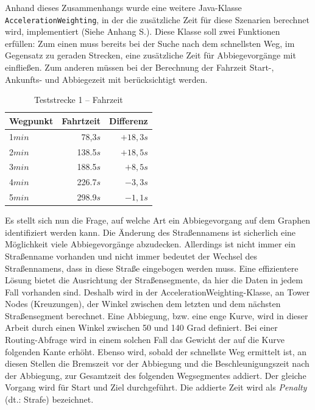 Anhand dieses Zusammenhangs wurde eine weitere Java-Klasse \texttt{AccelerationWeighting}, in der die zusätzliche Zeit für diese Szenarien berechnet wird, implementiert (Siehe Anhang S.\pageref{sec:source}).
Diese Klasse soll zwei Funktionen erfüllen:
Zum einen muss bereits bei der Suche nach dem schnellsten Weg, im Gegensatz zu geraden Strecken, eine zusätzliche Zeit für Abbiegevorgänge mit einfließen.
Zum anderen müssen bei der Berechnung der Fahrzeit Start-, Ankunfts- und Abbiegezeit mit berücksichtigt werden.

\begin{table}[htb]
\centering
\caption{Teststrecke 1 -- Fahrzeit}
\label{tab:drive11}
\begin{tabular}{|l|r|r|}
\hline
Wegpunkt & Fahrtzeit & Differenz \\ \hline 
1$min$ & 78,3$s$ & $+18,3s$ \\
2$min$ & 138.5$s$ & $+18,5s$ \\
3$min$ & 188.5$s$ & $+8,5s$ \\
4$min$ & 226.7$s$ & $-3,3s$ \\
5$min$ & 298.9$s$ & $-1,1s$ \\
\hline
\end{tabular}
\end{table}

Es stellt sich nun die Frage, auf welche Art ein Abbiegevorgang auf dem Graphen identifiziert werden kann.
Die Änderung des Straßennamens ist sicherlich eine Möglichkeit viele Abbiegevorgänge abzudecken.
Allerdings ist nicht immer ein Straßenname vorhanden und nicht immer bedeutet der Wechsel des Straßennamens, dass in diese Straße eingebogen werden muss.
Eine effizientere Lösung bietet die Ausrichtung der Straßensegmente, da hier die Daten in jedem Fall vorhanden sind.
Deshalb wird in der AccelerationWeighting-Klasse, an Tower Nodes (Kreuzungen), der Winkel zwischen dem letzten und dem nächsten Straßensegment berechnet.
Eine Abbiegung, bzw. eine enge Kurve, wird in dieser Arbeit durch einen Winkel zwischen 50 und 140 Grad definiert.
Bei einer Routing-Abfrage wird in einem solchen Fall das Gewicht der auf die Kurve folgenden Kante erhöht.
Ebenso wird, sobald der schnellste Weg ermittelt ist, an diesen Stellen die Bremszeit vor der Abbiegung und die Beschleunigungszeit nach der Abbiegung, zur Gesamtzeit des folgenden Wegsegmentes addiert.
Der gleiche Vorgang wird für Start und Ziel durchgeführt.
Die addierte Zeit wird als \textit{Penalty} (dt.: Strafe) bezeichnet.

